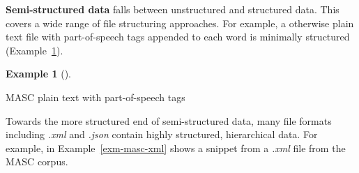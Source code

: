 \documentclass[
  letterpaper,
  DIV=11,
  numbers=noendperiod]{scrreprt}
\newenvironment{Shaded}{\begin{snugshade}}{\end{snugshade}}
\newcommand{\NormalTok}[1]{\textcolor[rgb]{0.00,0.00,0.00}{#1}}
\theoremstyle{definition}
\newtheorem{example}{Example}[chapter]
\theoremstyle{remark}
\begin{document}
\textbf{Semi-structured data} falls between unstructured and structured
data. This covers a wide range of file structuring approaches. For
example, a otherwise plain text file with part-of-speech tags appended
to each word is minimally structured (Example~\ref{exm-masc-pos}).

\begin{example}[]\protect\hypertarget{exm-masc-pos}{}\label{exm-masc-pos}

MASC plain text with part-of-speech tags

\begin{Shaded}
\end{Shaded}

\end{example}

Towards the more structured end of semi-structured data, many file
formats including \emph{.xml} and \emph{.json} contain highly
structured, hierarchical data. For example, in
Example~\ref{exm-masc-xml} shows a snippet from a \emph{.xml} file from
the MASC corpus.
\end{document}
